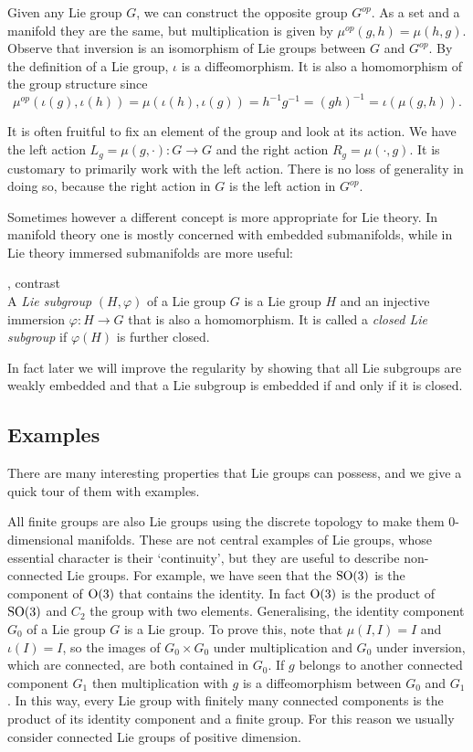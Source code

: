 Given any Lie group $G$, we can construct the opposite group $G^{op}$.
As a set and a manifold they are the same, but multiplication is given by $\mu^{op}(g,h) = \mu(h,g)$.
Observe that inversion is an isomorphism of Lie groups between $G$ and $G^{op}$.
By the definition of a Lie group, $\iota$ is a diffeomorphism.
It is also a homomorphism of the group structure since
\[
\mu^{op}(\iota(g),\iota(h))
= \mu(\iota(h),\iota(g))
= h^{-1}g^{-1}
= (gh)^{-1}
= \iota(\mu(g,h)).
\]

It is often fruitful to fix an element of the group and look at its action.
We have the left action $L_g = \mu(g,\cdot) : G \to G$ and the right action $R_g = \mu(\cdot,g)$.
It is customary to primarily work with the left action.
There is no loss of generality in doing so, because the right action in $G$ is the left action in $G^{op}$.

Sometimes however a different concept is more appropriate for Lie theory.
In manifold theory one is mostly concerned with embedded submanifolds, while in Lie theory immersed submanifolds are more useful:
\begin{definition}\label{Def:subgroup}
\textup{\cite[3.17]{Warner1983}, contrast~\cite[\S{}7.1]{Fulton2004}}\\
A \emph{Lie subgroup} $(H,\varphi)$ of a Lie group $G$ is a Lie group $H$ and an injective immersion $\varphi : H \to G$ that is also a homomorphism.
It is called a \emph{closed Lie subgroup} if $\varphi(H)$ is further closed.
\end{definition}

In fact later we will improve the regularity by showing that all Lie subgroups are weakly embedded and that a Lie subgroup is embedded if and only if it is closed.






\subsection{Examples}

There are many interesting properties that Lie groups can possess, and we give a quick tour of them with examples.

All finite groups are also Lie groups using the discrete topology to make them $0$-dimensional manifolds.
These are not central examples of Lie groups, whose essential character is their `continuity', but they are useful to describe non-connected Lie groups.
For example, we have seen that the $\mathrm{SO}(3)$ is the component of $\mathrm{O}(3)$ that contains the identity.
In fact $\mathrm{O}(3)$ is the product of $\mathrm{SO}(3)$ and $C_2$ the group with two elements.
Generalising, the identity component $G_0$ of a Lie group $G$ is a Lie group.
To prove this, note that $\mu(I,I) = I$ and $\iota(I) = I$, so the images of $G_0\times G_0$ under multiplication and $G_0$ under inversion, which are connected, are both contained in $G_0$.
If $g$ belongs to another connected component $G_1$ then multiplication with $g$ is a diffeomorphism between $G_0$ and $G_1$.
In this way, every Lie group with finitely many connected components is the product of its identity component and a finite group.
For this reason we usually consider connected Lie groups of positive dimension.


